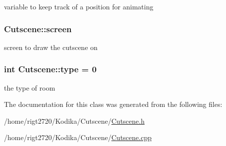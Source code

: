 variable to keep track of a position for animating 

\hypertarget{classCutscene_a70df90fafe45f9a661d9e05ac4dd2a22}{
\subsubsection[{screen}]{ Cutscene\-::screen\hspace{0.3cm}{\ttfamily [private]}}}\label{classCutscene_a70df90fafe45f9a661d9e05ac4dd2a22}


screen to draw the cutscene on 

\hypertarget{classCutscene_ac07858b694eab044576aa40257406e69}{
\subsubsection[{type}]{\setlength{\rightskip}{0pt plus 5cm}int Cutscene\-::type = 0\hspace{0.3cm}{\ttfamily [private]}}}\label{classCutscene_ac07858b694eab044576aa40257406e69}


the type of room 



The documentation for this class was generated from the following files\-:\begin{DoxyCompactItemize}
\item 
/home/rigt2720/\-Kodika/\-Cutscene/\hyperlink{Cutscene_8h}{Cutscene.\-h}\item 
/home/rigt2720/\-Kodika/\-Cutscene/\hyperlink{Cutscene_8cpp}{Cutscene.\-cpp}\end{DoxyCompactItemize}
